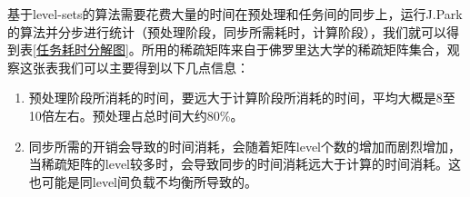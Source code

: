 \begin{table}[]
    \caption{基于level-sets算法\cite{park2014sparsifying}的任务耗时分解图}
    \label{任务耗时分解图}
\end{table}


基于level-sets的算法需要花费大量的时间在预处理和任务间的同步上，运行J.Park的算法并分步进行统计（预处理阶段，同步所需耗时，计算阶段），我们就可以得到表\ref{任务耗时分解图}。所用的稀疏矩阵来自于佛罗里达大学的稀疏矩阵集合\cite{davis2011university}，观察这张表我们可以主要得到以下几点信息：
\begin{enumerate} \setlength{\itemsep}{0pt}
\item 预处理阶段所消耗的时间，要远大于计算阶段所消耗的时间，平均大概是8至10倍左右。预处理占总时间大约80\%。
\item 同步所需的开销会导致的时间消耗，会随着矩阵level个数的增加而剧烈增加，当稀疏矩阵的level较多时，会导致同步的时间消耗远大于计算的时间消耗。这也可能是同level间负载不均衡所导致的。
\end{enumerate}


